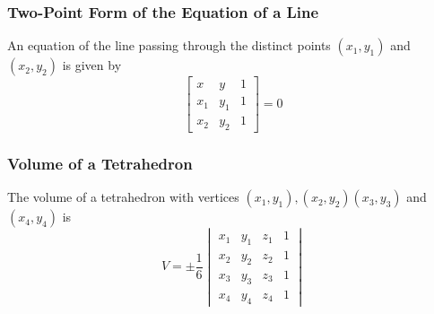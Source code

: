 \documentclass[12pt, letterpaper, twoside]{article}
\begin{document}
\subsubsection*{Two-Point Form of the Equation of a Line}
An equation of the line passing through the distinct points $(x_1,y_1)$ and $(x_2,y_2)$ is given by 
$$
\begin{bmatrix}
 x & y & 1\\
 x_1 & y_1 & 1\\
 x_2 & y_2 & 1
\end{bmatrix}
= 0
$$

\subsubsection*{Volume of a Tetrahedron}
The volume of a tetrahedron with vertices $(x_1,y_1), (x_2,y_2) (x_3, y_3)$ and $(x_4, y_4)$ is 
$$
V = \pm \frac{1}{6}
\begin{vmatrix}
 x_1 & y_1 & z_1 & 1\\
 x_2 & y_2 & z_2 & 1\\
 x_3 & y_3 & z_3 & 1\\
 x_4 & y_4 & z_4 & 1
\end{vmatrix}
$$
\end{document}
